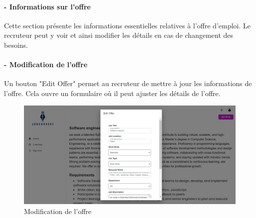 \paragraph{- Informations sur l'offre}
Cette section présente les informations essentielles 
relatives à l'offre d'emploi. Le recruteur peut y voir et 
ainsi modifier les détails en cas de changement des besoins. 

\paragraph*{- Modification de l'offre}
Un bouton "Edit Offer" permet au recruteur de mettre 
à jour les informations de l'offre. 
Cela ouvre un formulaire où il peut ajuster les détails 
de l'offre.
\begin{figure}[htbp]
   \centering
   \includegraphics[scale=0.2]{screens/editOffer.png}
   \caption{Modification de l'offre}
   \label{fig
   }
   \end{figure}

